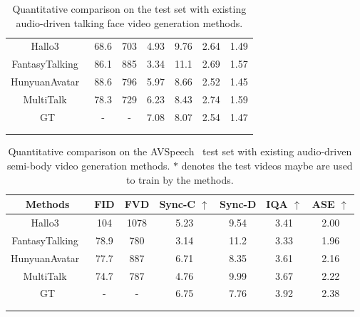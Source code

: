 \begin{table}[htp!]
\begin{tabular}{c|cccccc}
Hallo3~\cite{cui2024hallo3} & 68.6 & 703 & 4.93 & 9.76 & 2.64 & 1.49 \\ 
FantasyTalking~\cite{wang2025fantasytalking} & 86.1 & 885 & 3.34 & 11.1 & 2.69 & 1.57  \\ 
HunyuanAvatar~\cite{chen2025hunyuanvideoavatar} & 88.6 & 796 & 5.97 & 8.66 & 2.52 & 1.45\\ 
MultiTalk~\cite{kong2025let} & 78.3 & 729 & 6.23 & 8.43 & 2.74  &  1.59 \\ 
GT  & - & - & 7.08 & 8.07 & 2.54 & 1.47 \\
\cellcolor[HTML]{D9D9D9}{Ours} & \cellcolor[HTML]{D9D9D9}{\textbf{66.5}} & \cellcolor[HTML]{D9D9D9}{\textbf{692}} & \cellcolor[HTML]{D9D9D9}{\textbf{6.32}} & \cellcolor[HTML]{D9D9D9}{\textbf{8.38}} & \cellcolor[HTML]{D9D9D9}{2.63} & \cellcolor[HTML]{D9D9D9}{1.51} \\ \Xhline{1pt}
\end{tabular}
\vspace{-0.1in}
\caption{Quantitative comparison on the test set with existing audio-driven talking face video generation methods.}
\vspace{-0.3in}
\label{tab:face}
\end{table}

\begin{table}[htp!]
\centering
\small
\begin{tabular}{c|cccccc}
\Xhline{1pt}
\textbf{Methods} &  \textbf{FID}    & \textbf{FVD}     & \textbf{Sync-C}  $\uparrow$  & \textbf{Sync-D}      & \textbf{IQA}  $\uparrow$  & \textbf{ASE}  $\uparrow$ \\ \hline
Hallo3~\cite{cui2024hallo3} & 104 & 1078 & 5.23 & 9.54 & 3.41 & 2.00 \\
FantasyTalking~\cite{wang2025fantasytalking} & 78.9 & 780 & 3.14 & 11.2 & 3.33 & 1.96   \\ 
HunyuanAvatar~\cite{chen2025hunyuanvideoavatar} & 77.7 & 887 & 6.71 & 8.35 &  3.61 & 2.16 \\ 
MultiTalk~\cite{kong2025let} & 74.7 & 787 & 4.76 & 9.99 &  3.67 & 2.22  \\ 
GT & - & - & 6.75 & 7.76 & 3.92  &  2.38 \\ 
\cellcolor[HTML]{D9D9D9}{Ours} & \cellcolor[HTML]{D9D9D9}{\textbf{67.6}} & \cellcolor[HTML]{D9D9D9}{\textbf{664}} & \cellcolor[HTML]{D9D9D9}{\textbf{7.12}} & \cellcolor[HTML]{D9D9D9}{\textbf{8.05}} & \cellcolor[HTML]{D9D9D9}{\textbf{3.75}} & \cellcolor[HTML]{D9D9D9}{\textbf{2.25}} \\ \Xhline{1pt}
\end{tabular}
\vspace{-0.1in}
\caption{Quantitative comparison on the AVSpeech~\cite{ephrat2018looking} test set with existing audio-driven semi-body video generation methods. $*$ denotes the test videos maybe are used to train by the methods.}
\vspace{-0.3in}
\label{tab:semi-body}
\end{table}


